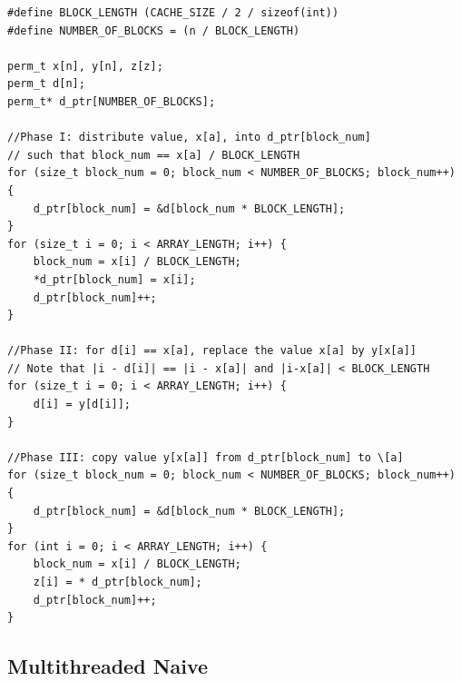 \documentclass{article}
\begin{document}
\begin{lstlisting}[style=CStyle, caption={Cooperman \& Ma Algorithm\cite{Cooperman2002OvercomingTM}}]
#define BLOCK_LENGTH (CACHE_SIZE / 2 / sizeof(int))
#define NUMBER_OF_BLOCKS = (n / BLOCK_LENGTH)

perm_t x[n], y[n], z[z];
perm_t d[n];
perm_t* d_ptr[NUMBER_OF_BLOCKS];

//Phase I: distribute value, x[a], into d_ptr[block_num]
// such that block_num == x[a] / BLOCK_LENGTH
for (size_t block_num = 0; block_num < NUMBER_OF_BLOCKS; block_num++) {
    d_ptr[block_num] = &d[block_num * BLOCK_LENGTH];
}
for (size_t i = 0; i < ARRAY_LENGTH; i++) {
    block_num = x[i] / BLOCK_LENGTH;
    *d_ptr[block_num] = x[i];
    d_ptr[block_num]++;
}

//Phase II: for d[i] == x[a], replace the value x[a] by y[x[a]]
// Note that |i - d[i]| == |i - x[a]| and |i-x[a]| < BLOCK_LENGTH
for (size_t i = 0; i < ARRAY_LENGTH; i++) {
    d[i] = y[d[i]];
}

//Phase III: copy value y[x[a]] from d_ptr[block_num] to \[a]
for (size_t block_num = 0; block_num < NUMBER_OF_BLOCKS; block_num++) {
    d_ptr[block_num] = &d[block_num * BLOCK_LENGTH];
}
for (int i = 0; i < ARRAY_LENGTH; i++) {
    block_num = x[i] / BLOCK_LENGTH;
    z[i] = * d_ptr[block_num];
    d_ptr[block_num]++;
}

\end{lstlisting}

\subsection{Multithreaded Naive}



\end{document}
